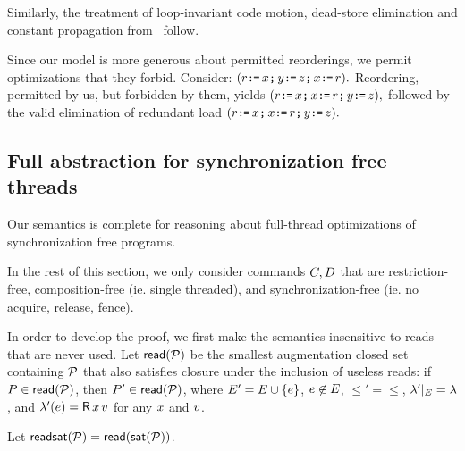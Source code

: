 Similarly, the treatment of loop-invariant code motion, dead-store
elimination and constant propagation
from~\citet{Dolan:2018:BDR:3192366.3192421} follow.

Since
our model is more generous about permitted reorderings, we permit
optimizations that they forbid.  Consider:
\begin{math}
  (r \texttt{:}\mkern-1mu\texttt{=}\, x \texttt{;}\, y \texttt{:}\mkern-1mu\texttt{=}\, z  \texttt{;}\, x \texttt{:}\mkern-1mu\texttt{=}\, r).
\end{math}
Reordering, permitted by us, but forbidden by them, yields
\begin{math}
  (r \texttt{:}\mkern-1mu\texttt{=}\, x \texttt{;}\, x \texttt{:}\mkern-1mu\texttt{=}\, r \texttt{;}\, y \texttt{:}\mkern-1mu\texttt{=}\, z),
\end{math}
followed by the valid elimination of redundant load
\begin{math}
  (r \texttt{:}\mkern-1mu\texttt{=}\, x \texttt{;}\, x \texttt{:}\mkern-1mu\texttt{=}\, r \texttt{;}\, y \texttt{:}\mkern-1mu\texttt{=}\, z).
\end{math}

\subsection{Full abstraction for synchronization free threads}
Our semantics is complete for reasoning about full-thread optimizations of synchronization free programs.

In the rest of this section, we only consider commands $C,D$ that are
restriction-free, composition-free (ie. single threaded), and
synchronization-free (ie. no acquire, release, fence).

In order to develop the proof, we first make the semantics insensitive to
reads that are never used.  Let ${\mathsf{read}}(\mathcal{P})$ be the smallest augmentation
closed set containing $\mathcal{P}$ that also satisfies closure under the inclusion
of useless reads: if $P \in {\mathsf{read}}(\mathcal{P})$, then
$P' \in {\mathsf{read}}(\mathcal{P})$, where $E'= E\cup\{e\}$,
$e \not \in E$, ${\le'} ={\le}$,
${\lambda'} \mathbin{|}_{E} = {\lambda}$, and
$\labeling'(\aEv) = \DR{\aLoc}{\aVal}$ for any $x$ and $v$.

Let $\mathsf{readsat}(\mathcal{P})= {\mathsf{read}}(\mathsf{sat}(\mathcal{P}))$.

